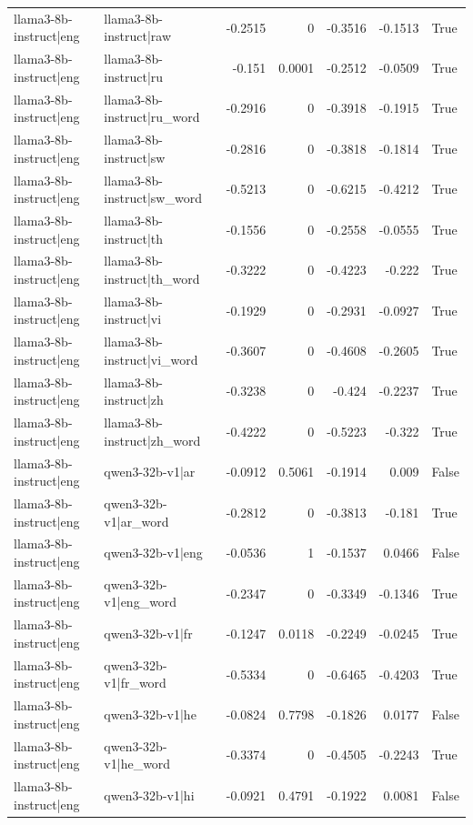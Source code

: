 \begin{table}
\begin{tabular}{l l r r r r l}
llama3-8b-instruct|eng & llama3-8b-instruct|raw & -0.2515 & 0 & -0.3516 & -0.1513 & True \\
llama3-8b-instruct|eng & llama3-8b-instruct|ru & -0.151 & 0.0001 & -0.2512 & -0.0509 & True \\
llama3-8b-instruct|eng & llama3-8b-instruct|ru_word & -0.2916 & 0 & -0.3918 & -0.1915 & True \\
llama3-8b-instruct|eng & llama3-8b-instruct|sw & -0.2816 & 0 & -0.3818 & -0.1814 & True \\
llama3-8b-instruct|eng & llama3-8b-instruct|sw_word & -0.5213 & 0 & -0.6215 & -0.4212 & True \\
llama3-8b-instruct|eng & llama3-8b-instruct|th & -0.1556 & 0 & -0.2558 & -0.0555 & True \\
llama3-8b-instruct|eng & llama3-8b-instruct|th_word & -0.3222 & 0 & -0.4223 & -0.222 & True \\
llama3-8b-instruct|eng & llama3-8b-instruct|vi & -0.1929 & 0 & -0.2931 & -0.0927 & True \\
llama3-8b-instruct|eng & llama3-8b-instruct|vi_word & -0.3607 & 0 & -0.4608 & -0.2605 & True \\
llama3-8b-instruct|eng & llama3-8b-instruct|zh & -0.3238 & 0 & -0.424 & -0.2237 & True \\
llama3-8b-instruct|eng & llama3-8b-instruct|zh_word & -0.4222 & 0 & -0.5223 & -0.322 & True \\
llama3-8b-instruct|eng & qwen3-32b-v1|ar & -0.0912 & 0.5061 & -0.1914 & 0.009 & False \\
llama3-8b-instruct|eng & qwen3-32b-v1|ar_word & -0.2812 & 0 & -0.3813 & -0.181 & True \\
llama3-8b-instruct|eng & qwen3-32b-v1|eng & -0.0536 & 1 & -0.1537 & 0.0466 & False \\
llama3-8b-instruct|eng & qwen3-32b-v1|eng_word & -0.2347 & 0 & -0.3349 & -0.1346 & True \\
llama3-8b-instruct|eng & qwen3-32b-v1|fr & -0.1247 & 0.0118 & -0.2249 & -0.0245 & True \\
llama3-8b-instruct|eng & qwen3-32b-v1|fr_word & -0.5334 & 0 & -0.6465 & -0.4203 & True \\
llama3-8b-instruct|eng & qwen3-32b-v1|he & -0.0824 & 0.7798 & -0.1826 & 0.0177 & False \\
llama3-8b-instruct|eng & qwen3-32b-v1|he_word & -0.3374 & 0 & -0.4505 & -0.2243 & True \\
llama3-8b-instruct|eng & qwen3-32b-v1|hi & -0.0921 & 0.4791 & -0.1922 & 0.0081 & False \\

\end{tabular}
\end{table}
